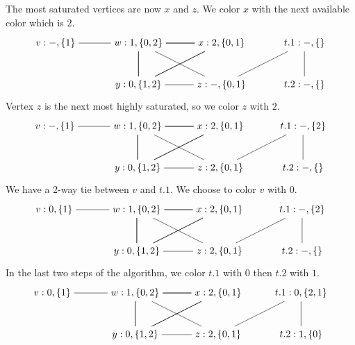 \documentclass[11pt]{book}
\begin{document}
The most saturated vertices are now $x$ and $z$. We color $x$ with the
next available color which is $2$.
\[
\begin{tikzpicture}[baseline=(current  bounding  box.center)]
\node (v) at (0,0)    {$v:-,\{1\}$};
\node (w) at (3,0)    {$w:1,\{0,2\}$};
\node (x) at (6,0)    {$x:2,\{0,1\}$};
\node (y) at (3,-1.5) {$y:0,\{1,2\}$};
\node (z) at (6,-1.5) {$z:-,\{0,1\}$};
\node (t1) at (9,0)   {$t.1:-,\{\}$};
\node (t2) at (9,-1.5) {$t.2:-,\{\}$};
\draw (t1) to (z);
\draw (t2) to (t1);
\draw (v) to (w);
\foreach \i in {w,x,y}
{
  \foreach \j in {w,x,y}
  {
    \draw (\i) to (\j);
  }
}
\draw (z) to (w);
\draw (z) to (y);
\end{tikzpicture}
\]
Vertex $z$ is the next most highly saturated, so we color $z$ with $2$.
\[
\begin{tikzpicture}[baseline=(current  bounding  box.center)]
\node (v) at (0,0)   {$v:-,\{1\}$};
\node (w) at (3,0)   {$w:1,\{0,2\}$};
\node (x) at (6,0)   {$x:2,\{0,1\}$};
\node (y) at (3,-1.5)  {$y:0,\{1,2\}$};
\node (z) at (6,-1.5)  {$z:2,\{0,1\}$};
\node (t1) at (9,0)   {$t.1:-,\{2\}$};
\node (t2) at (9,-1.5) {$t.2:-,\{\}$};
\draw (t1) to (z);
\draw (t2) to (t1);
\draw (v) to (w);
\foreach \i in {w,x,y}
{
  \foreach \j in {w,x,y}
  {
    \draw (\i) to (\j);
  }
}
\draw (z) to (w);
\draw (z) to (y);
\end{tikzpicture}
\]
We have a 2-way tie between $v$ and $t.1$. We choose to color $v$ with
$0$.
\[
\begin{tikzpicture}[baseline=(current  bounding  box.center)]
\node (v) at (0,0)   {$v:0,\{1\}$};
\node (w) at (3,0)   {$w:1,\{0,2\}$};
\node (x) at (6,0)   {$x:2,\{0,1\}$};
\node (y) at (3,-1.5)  {$y:0,\{1,2\}$};
\node (z) at (6,-1.5)  {$z:2,\{0,1\}$};
\node (t1) at (9,0)   {$t.1:-,\{2\}$};
\node (t2) at (9,-1.5) {$t.2:-,\{\}$};
\draw (t1) to (z);
\draw (t2) to (t1);
\draw (v) to (w);
\foreach \i in {w,x,y}
{
  \foreach \j in {w,x,y}
  {
    \draw (\i) to (\j);
  }
}
\draw (z) to (w);
\draw (z) to (y);
\end{tikzpicture}
\]
In the last two steps of the algorithm, we color $t.1$ with $0$
then $t.2$ with $1$.
\[
\begin{tikzpicture}[baseline=(current  bounding  box.center)]
\node (v) at (0,0)   {$v:0,\{1\}$};
\node (w) at (3,0)   {$w:1,\{0,2\}$};
\node (x) at (6,0)   {$x:2,\{0,1\}$};
\node (y) at (3,-1.5)  {$y:0,\{1,2\}$};
\node (z) at (6,-1.5)  {$z:2,\{0,1\}$};
\node (t1) at (9,0)   {$t.1:0,\{2,1\}$};
\node (t2) at (9,-1.5) {$t.2:1,\{0\}$};
\draw (t1) to (z);
\draw (t2) to (t1);
\draw (v) to (w);
\foreach \i in {w,x,y}
{
  \foreach \j in {w,x,y}
  {
    \draw (\i) to (\j);
  }
}
\draw (z) to (w);
\draw (z) to (y);
\end{tikzpicture}
\]
\end{document}
